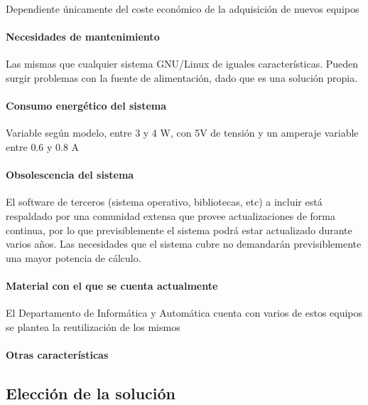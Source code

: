 Dependiente únicamente del coste económico de la adquisición de nuevos equipos

\paragraph{Necesidades de mantenimiento}

Las mismas que cualquier sistema GNU/Linux de iguales características.
Pueden surgir problemas con la fuente de alimentación, dado que es una solución propia.

\paragraph{Consumo energético del sistema}

Variable según modelo, entre 3 y 4 W, con 5V de tensión y un amperaje variable entre 0.6 y 0.8 A

\paragraph{Obsolescencia del sistema}

El software de terceros (sistema operativo, bibliotecas, etc) a incluir está respaldado por una comunidad extensa que provee actualizaciones de forma continua, por lo que previsiblemente el sistema podrá estar actualizado durante varios años.
Las necesidades que el sistema cubre no demandarán previsiblemente una mayor potencia de cálculo.
 

\paragraph{Material con el que se cuenta actualmente}

El Departamento de Informática y Automática cuenta con varios de estos equipos se plantea la reutilización de los mismos

\paragraph{Otras características}



\subsection{Elección de la solución}

